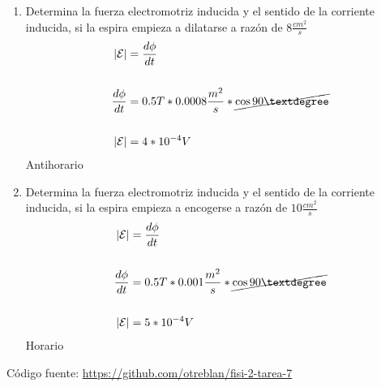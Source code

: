 \documentclass[10pt, twoside]{article}
\begin{document}
\begin{enumerate}[label=\alph*)]
	\item Determina la fuerza electromotriz inducida y el sentido de la
		corriente inducida, si la espira empieza a dilatarse a razón de
		$8 \frac{cm^2}{s} $
		\begin{align*}
			|\mathcal{E}| &= \frac{d\phi}{dt}\\
			\\
			\frac{d\phi}{dt} &= 0.5T* 0.0008 \frac{m^2}{s} * \cancel{\cos{90°}}\\
			\\
			|\mathcal{E}| &= 4*10^{-4}V
		\end{align*}
		Antihorario
	\item Determina la fuerza electromotriz inducida y el sentido de la
		corriente inducida, si la espira empieza a encogerse a razón de
		$10 \frac{cm^2}{s} $
		\begin{align*}
			|\mathcal{E}| &= \frac{d\phi}{dt}\\
			\\
			\frac{d\phi}{dt} &= 0.5T* 0.001 \frac{m^2}{s} * \cancel{\cos{90°}}\\
			\\
			|\mathcal{E}| &= 5*10^{-4}V
		\end{align*}
		Horario
\end{enumerate}

\vfill
Código fuente: \url{https://github.com/otreblan/fisi-2-tarea-7}
\end{document}

